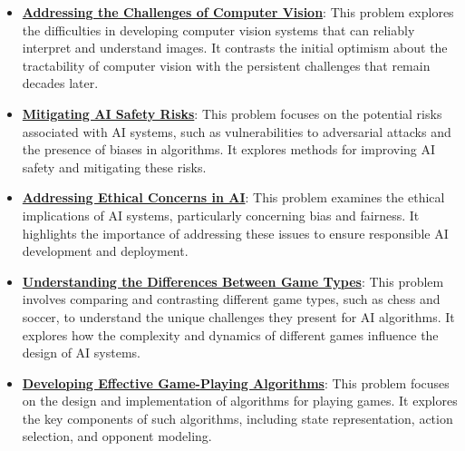 \documentclass{article}%
\begin{document}
\begin{itemize}[leftmargin=*]
\item \href{https://purdue.brightspace.com/d2l/common/assets/pdfjs-d2l-dist/1.0.14-legacy/web/viewer.html?file=%2Fcontent%2Fenforced%2F1095467-wl.202510.CS.24300.001%2F02L2-Intro.pdf%3Fou%3D1095467&lang=en-us&container=d2l-fileviewer-rendered-pdf&fullscreen=d2l-fileviewer-rendered-pdf-dialog&height=667#page=15}{\textbf{Addressing the Challenges of Computer Vision}}: This problem explores the difficulties in developing computer vision systems that can reliably interpret and understand images. It contrasts the initial optimism about the tractability of computer vision with the persistent challenges that remain decades later.%
\item \href{https://purdue.brightspace.com/d2l/common/assets/pdfjs-d2l-dist/1.0.14-legacy/web/viewer.html?file=%2Fcontent%2Fenforced%2F1095467-wl.202510.CS.24300.001%2F02L2-Intro.pdf%3Fou%3D1095467&lang=en-us&container=d2l-fileviewer-rendered-pdf&fullscreen=d2l-fileviewer-rendered-pdf-dialog&height=667#page=19}{\textbf{Mitigating AI Safety Risks}}: This problem focuses on the potential risks associated with AI systems, such as vulnerabilities to adversarial attacks and the presence of biases in algorithms. It explores methods for improving AI safety and mitigating these risks.%
\item \href{https://purdue.brightspace.com/d2l/common/assets/pdfjs-d2l-dist/1.0.14-legacy/web/viewer.html?file=%2Fcontent%2Fenforced%2F1095467-wl.202510.CS.24300.001%2F02L2-Intro.pdf%3Fou%3D1095467&lang=en-us&container=d2l-fileviewer-rendered-pdf&fullscreen=d2l-fileviewer-rendered-pdf-dialog&height=667#page=20}{\textbf{Addressing Ethical Concerns in AI}}: This problem examines the ethical implications of AI systems, particularly concerning bias and fairness. It highlights the importance of addressing these issues to ensure responsible AI development and deployment.%
\item \href{https://purdue.brightspace.com/d2l/common/assets/pdfjs-d2l-dist/1.0.14-legacy/web/viewer.html?file=%2Fcontent%2Fenforced%2F1095467-wl.202510.CS.24300.001%2F02L2-Intro.pdf%3Fou%3D1095467&lang=en-us&container=d2l-fileviewer-rendered-pdf&fullscreen=d2l-fileviewer-rendered-pdf-dialog&height=667#page=27}{\textbf{Understanding the Differences Between Game Types}}: This problem involves comparing and contrasting different game types, such as chess and soccer, to understand the unique challenges they present for AI algorithms. It explores how the complexity and dynamics of different games influence the design of AI systems.%
\item \href{https://purdue.brightspace.com/d2l/common/assets/pdfjs-d2l-dist/1.0.14-legacy/web/viewer.html?file=%2Fcontent%2Fenforced%2F1095467-wl.202510.CS.24300.001%2F02L2-Intro.pdf%3Fou%3D1095467&lang=en-us&container=d2l-fileviewer-rendered-pdf&fullscreen=d2l-fileviewer-rendered-pdf-dialog&height=667#page=22}{\textbf{Developing Effective Game{-}Playing Algorithms}}: This problem focuses on the design and implementation of algorithms for playing games. It explores the key components of such algorithms, including state representation, action selection, and opponent modeling.%

\end{itemize}
\end{document}
